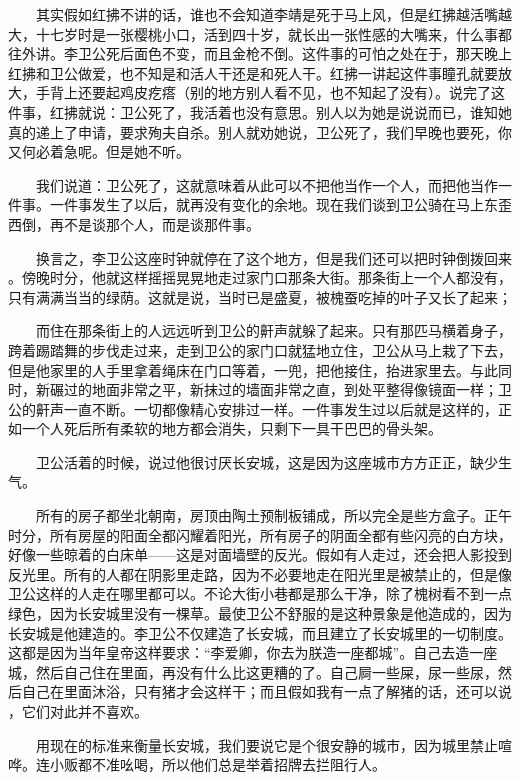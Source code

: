 　　其实假如红拂不讲的话，谁也不会知道李靖是死于马上风，但是红拂越活嘴越 大，十七岁时是一张樱桃小口，活到四十岁，就长出一张性感的大嘴来，什么事都 往外讲。李卫公死后面色不变，而且金枪不倒。这件事的可怕之处在于，那天晚上 红拂和卫公做爱，也不知是和活人干还是和死人干。红拂一讲起这件事瞳孔就要放 大，手背上还要起鸡皮疙瘩（别的地方别人看不见，也不知起了没有）。说完了这 件事，红拂就说：卫公死了，我活着也没有意思。别人以为她是说说而已，谁知她 真的递上了申请，要求殉夫自杀。别人就劝她说，卫公死了，我们早晚也要死，你 又何必着急呢。但是她不听。 

　　我们说道：卫公死了，这就意味着从此可以不把他当作一个人，而把他当作一 件事。一件事发生了以后，就再没有变化的余地。现在我们谈到卫公骑在马上东歪 西倒，再不是谈那个人，而是谈那件事。 

　　换言之，李卫公这座时钟就停在了这个地方，但是我们还可以把时钟倒拨回来 。傍晚时分，他就这样摇摇晃晃地走过家门口那条大街。那条街上一个人都没有， 只有满满当当的绿荫。这就是说，当时已是盛夏，被槐蚕吃掉的叶子又长了起来； 
 
 　　而住在那条街上的人远远听到卫公的鼾声就躲了起来。只有那匹马横着身子， 跨着踢踏舞的步伐走过来，走到卫公的家门口就猛地立住，卫公从马上栽了下去， 但是他家里的人手里拿着绳床在门口等着，一兜，把他接住，抬进家里去。与此同 时，新碾过的地面非常之平，新抹过的墙面非常之直，到处平整得像镜面一样；卫 公的鼾声一直不断。一切都像精心安排过一样。一件事发生过以后就是这样的，正 如一个人死后所有柔软的地方都会消失，只剩下一具干巴巴的骨头架。 

　　卫公活着的时候，说过他很讨厌长安城，这是因为这座城市方方正正，缺少生 气。

 　　所有的房子都坐北朝南，房顶由陶土预制板铺成，所以完全是些方盒子。正午 时分，所有房屋的阳面全都闪耀着阳光，所有房子的阴面全都有些闪亮的白方块， 好像一些晾着的白床单——这是对面墙壁的反光。假如有人走过，还会把人影投到 反光里。所有的人都在阴影里走路，因为不必要地走在阳光里是被禁止的，但是像 卫公这样的人走在哪里都可以。不论大街小巷都是那么干净，除了槐树看不到一点 绿色，因为长安城里没有一棵草。最使卫公不舒服的是这种景象是他造成的，因为 长安城是他建造的。李卫公不仅建造了长安城，而且建立了长安城里的一切制度。 这都是因为当年皇帝这样要求：“李爱卿，你去为朕造一座都城”。自己去造一座 城，然后自己住在里面，再没有什么比这更糟的了。自己屙一些屎，尿一些尿，然 后自己在里面沐浴，只有猪才会这样干；而且假如我有一点了解猪的话，还可以说 ，它们对此并不喜欢。 

　　用现在的标准来衡量长安城，我们要说它是个很安静的城市，因为城里禁止喧 哗。连小贩都不准吆喝，所以他们总是举着招牌去拦阻行人。

